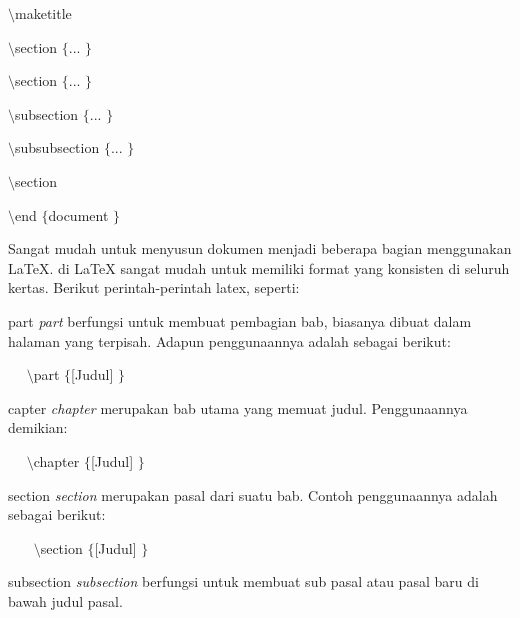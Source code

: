 {\fontsize{10pt}{10pt}\selectfont  $  \setminus  $maketitle}
 \par
\vspace{10pt}
{\fontsize{10pt}{10pt}\selectfont  $  \setminus  $section $  \{  $... $  \}  $}
 \par
\vspace{10pt}
{\fontsize{10pt}{10pt}\selectfont  $  \setminus  $section $  \{  $... $  \}  $}
 \par
\vspace{10pt}
{\fontsize{10pt}{10pt}\selectfont  $  \setminus  $subsection $  \{  $... $  \}  $}
 \par
\vspace{10pt}
{\fontsize{10pt}{10pt}\selectfont  $  \setminus  $subsubsection $  \{  $... $  \}  $}
 \par
\vspace{10pt}
{\fontsize{10pt}{10pt}\selectfont  $  \setminus  $section}
 \par
\vspace{10pt}
{\fontsize{10pt}{10pt}\selectfont  $  \setminus  $end $  \{  $document $  \}  $}
 \par
\vspace{10pt}
\vspace{12pt}
Sangat mudah untuk menyusun dokumen menjadi beberapa bagian menggunakan LaTeX. di LaTeX sangat mudah untuk memiliki format yang konsisten di seluruh kertas. Berikut perintah-perintah latex, seperti:
 \par
part\vspace{\baselineskip}
\textit{part} berfungsi untuk membuat pembagian bab, biasanya dibuat dalam halaman yang terpisah. Adapun penggunaannya adalah sebagai berikut:
 \par
{\fontsize{10pt}{10pt}\selectfont ~~  $  \setminus  $part $  \{  $[Judul] $  \}  $}
 \par
capter\vspace{\baselineskip}
\textit{chapter} merupakan bab utama yang memuat judul. Penggunaannya demikian:
 \par
{\fontsize{10pt}{10pt}\selectfont ~~  $  \setminus  $chapter $  \{  $[Judul] $  \}  $}
 \par
section\vspace{\baselineskip}
\textit{section} merupakan pasal dari suatu bab. Contoh penggunaannya adalah sebagai berikut:
 \par
{\fontsize{10pt}{10pt}\selectfont ~~~  $  \setminus  $section $  \{  $[Judul] $  \}  $}
 \par
subsection \textit{subsection} berfungsi untuk membuat sub pasal atau pasal baru di bawah judul pasal.
